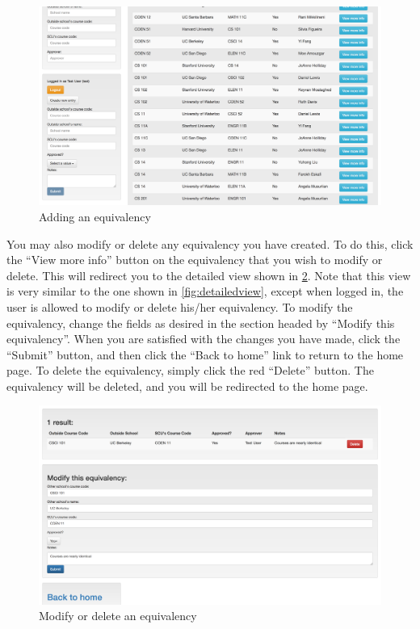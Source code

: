 \documentclass{article}
\begin{document}
\begin{figure}[h]
\includegraphics[width=15cm]{addequivalency}
\centering
\caption{Adding an equivalency}
\label{fig:addequivalency}
\end{figure}

\par You may also modify or delete any equivalency you have created. To do
this, click the ``View more info'' button on the equivalency that you wish to
modify or delete. This will redirect you to the detailed view shown in \cref{fig:modify}.
Note that this view is very similar to the one shown in \cref{fig:detailedview}, except when
logged in, the user is allowed to modify or delete his/her equivalency. To
modify the equivalency, change the fields as desired in the section headed by
``Modify this equivalency''. When you are satisfied with the changes you have
made, click the ``Submit'' button, and then click the ``Back to home'' link to
return to the home page. To delete the equivalency, simply click the red
``Delete'' button. The equivalency will be deleted, and you will be redirected
to the home page.

\begin{figure}[h]
\includegraphics[width=15cm]{modify}
\centering
\caption{Modify or delete an equivalency}
\label{fig:modify}
\end{figure}
\end{document}
